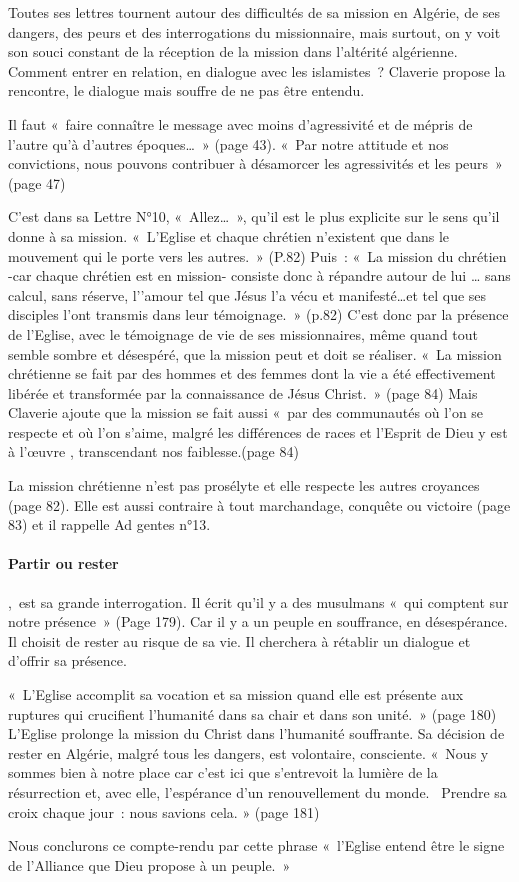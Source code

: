 Toutes ses lettres tournent autour des difficultés de sa mission en Algérie, de ses dangers, des peurs et des interrogations du missionnaire, mais surtout, on y voit son souci constant de la réception de la mission dans l’altérité algérienne. Comment entrer en relation, en dialogue avec les islamistes ? Claverie propose la rencontre, le dialogue mais souffre de ne pas être entendu. 

Il faut « faire connaître le message avec moins d’agressivité et de mépris de l’autre qu’à d’autres époques… » (page 43). « Par notre attitude et nos convictions, nous pouvons contribuer à désamorcer les agressivités et les peurs » (page 47)

C’est dans sa Lettre N°10, « Allez… », qu’il est le plus explicite sur le sens qu’il donne à sa mission. « L’Eglise et chaque chrétien n’existent que dans le mouvement qui le porte vers les autres. » (P.82) Puis : « La mission du chrétien -car chaque chrétien est en mission- consiste donc à répandre autour de lui … sans calcul, sans réserve, l’’amour tel que Jésus l’a vécu et manifesté…et tel que ses disciples l’ont transmis dans leur témoignage. » (p.82) C’est donc par la présence de l’Eglise, avec le témoignage de vie de ses missionnaires, même quand tout semble sombre et désespéré, que la mission peut et doit se réaliser. « La mission chrétienne se fait par des hommes et des femmes dont la vie a été effectivement libérée et transformée par la connaissance de Jésus Christ. » (page 84) Mais Claverie ajoute que la mission se fait aussi « par des communautés où l’on se respecte et où l’on s’aime, malgré les différences de races et l’Esprit de Dieu y est à l’œuvre , transcendant nos faiblesse.(page 84)

La mission chrétienne n’est pas prosélyte et elle respecte les autres croyances (page 82). Elle est aussi contraire à tout marchandage, conquête ou victoire (page 83) et il rappelle Ad gentes n°13. 

\paragraph{Partir ou rester}
, est sa grande interrogation. Il écrit qu’il y a des musulmans « qui comptent sur notre présence » (Page 179). Car il y a un peuple en souffrance, en désespérance. Il choisit de rester au risque de sa vie. Il cherchera à rétablir un dialogue et d’offrir sa présence. 
\begin{singlequote}
    « L’Eglise accomplit sa vocation et sa mission quand elle est présente aux ruptures qui crucifient l’humanité dans sa chair et dans son unité. » (page 180) L’Eglise prolonge la mission du Christ dans l’humanité souffrante. Sa décision de rester en Algérie, malgré tous les dangers, est volontaire, consciente. « Nous y sommes bien à notre place car c’est ici que s’entrevoit la lumière de la résurrection et, avec elle, l’espérance d’un renouvellement du monde.  Prendre sa croix chaque jour : nous savions cela. » (page 181) 
\end{singlequote}


Nous conclurons ce compte-rendu par cette phrase « l’Eglise entend être le signe de l’Alliance que Dieu propose à un peuple. »

   